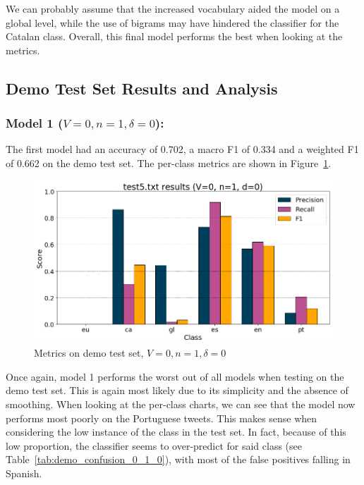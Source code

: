 \documentclass[runningheads]{llncs}
\begin{document}
We can probably assume that the increased vocabulary aided the model on a global level, while the use of bigrams may have hindered the classifier for the Catalan class. Overall, this final model performs the best when looking at the metrics.

\newpage

\subsection{Demo Test Set Results and Analysis}

\subsubsection{Model 1 ($V=0, n=1, \delta=0$): }
The first model had an accuracy of 0.702, a macro F1 of 0.334 and a weighted F1 of 0.662 on the demo test set. The per-class metrics are shown in Figure~\ref{fig:demo_0_1_0}. \\

\begin{figure}
    \begin{center}
        \includegraphics[width=12.5cm]{images/test5_results_0_1_0.png}
        \caption{Metrics on demo test set, $V=0, n=1, \delta=0$}
        \label{fig:demo_0_1_0}
    \end{center}
\end{figure}

Once again, model 1 performs the worst out of all models when testing on the demo test set. This is again most likely due to its simplicity and the absence of smoothing. When looking at the per-class charts, we can see that the model now performs most poorly on the Portuguese tweets. This makes sense when considering the low instance of the class in the test set. In fact, because of this low proportion, the classifier seems to over-predict for said class (see Table~\ref{tab:demo_confusion_0_1_0}), with most of the false positives falling in Spanish. \\
\end{document}
